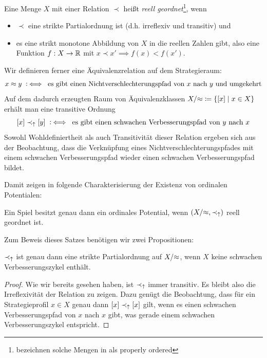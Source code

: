 \begin{defn}
	Eine Menge $X$ mit einer Relation $\prec$ heißt \emph{reell geordnet}\footnote{\citeauthor{CharExOrdPot} bezeichnen solche Mengen in \cite{CharExOrdPot} als \glqq properly ordered\grqq}, wenn 
	\begin{itemize}
		\item $\prec$ eine strikte Partialordnung ist (d.h. irreflexiv und transitiv) und 
		\item es eine strikt monotone Abbildung von $X$ in die reellen Zahlen gibt, also eine Funktion $f: X \to \mathbb{R}$ mit $x \prec x' \implies f(x) < f(x')$.
	\end{itemize}
\end{defn}

Wir definieren ferner eine Äquivalenzrelation auf dem Strategieraum:
	\[x \approx y \mathbin{~\mathop:\!\!\iff} \text{ es gibt einen Nichtverschlechterungspfad von $x$ nach $y$ und umgekehrt}\]
Auf dem dadurch erzeugten Raum von Äquivalenzklassen $X/{\approx} \coloneqq \left\lbrace[x] \mid x \in X\right\rbrace$ erhält man eine transitive Ordnung
	\[[x] \prec_\uparrow [y] \mathbin{~\mathop:\!\!\iff} \text{ es gibt einen schwachen Verbesserungspfad von $y$ nach $x$}\]
Sowohl Wohldefiniertheit als auch Transitivität dieser Relation ergeben sich aus der Beobachtung, dass die Verknüpfung eines Nichtverschlechterungspfades mit einem schwachen Verbesserungspfad wieder einen schwachen Verbesserungspfad bildet. 

Damit zeigen \citeauthor{CharExOrdPot} in \cite[Theorem 3.1]{CharExOrdPot} folgende Charakterisierung der Existenz von ordinalen Potentialen:

\begin{satz}\label{satz:CharOrdPot}
	Ein Spiel besitzt genau dann ein ordinales Potential, wenn $(X/{\approx}, \prec_\uparrow)$ reell geordnet ist.
\end{satz}

Zum Beweis dieses Satzes benötigen wir zwei Propositionen:

\begin{prop}\label{prop:SVordStrPO}
	$\prec_\uparrow$ ist genau dann eine strikte Partialordnung auf $X/{\approx}$, wenn $X$ keine schwachen Verbesserungszykel enthält.
\end{prop}

\begin{proof}
	Wie wir bereits gesehen haben, ist $\prec_\uparrow$ immer transitiv. Es bleibt also die Irreflexivität der Relation zu zeigen. Dazu genügt die Beobachtung, dass für ein Strategieprofil $x \in X$ genau dann $[x] \prec_\uparrow [x]$ gilt, wenn es einen schwachen Verbesserungspfad von $x$ nach $x$ gibt, was gerade einem schwachen Verbesserungszykel entspricht.
\end{proof}

